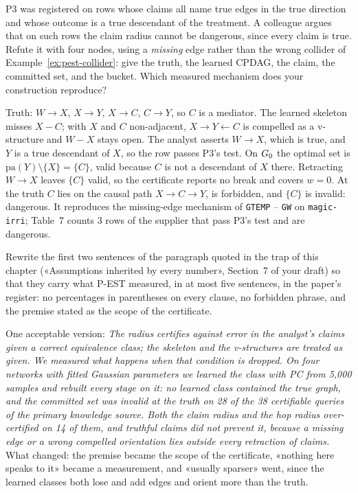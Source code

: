 \begin{exercicio}[metodo=counterexample,conceito=premissa-classe]
P3 was registered on rows whose claims all name true edges in the true direction and whose outcome is
a true descendant of the treatment. A colleague argues that on such rows the claim radius cannot be
dangerous, since every claim is true. Refute it with four nodes, using a \emph{missing} edge rather
than the wrong collider of Example~\ref{ex:pest-collider}: give the truth, the learned CPDAG, the claim,
the committed set, and the bucket. Which measured mechanism does your construction reproduce?
\end{exercicio}
\begin{solucao}
Truth: $W \to X$, $X \to Y$, $X \to C$, $C \to Y$, so $C$ is a mediator. The learned skeleton misses
$X - C$; with $X$ and $C$ non-adjacent, $X \to Y \leftarrow C$ is compelled as a v-structure and $W - X$
stays open. The analyst asserts $W \to X$, which is true, and $Y$ is a true descendant of $X$, so the
row passes P3's test. On $G_0$ the optimal set is $\mathrm{pa}(Y) \setminus \{X\} = \{C\}$, valid
because $C$ is not a descendant of $X$ there. Retracting $W \to X$ leaves $\{C\}$ valid, so the
certificate reports no break and covers $w = 0$. At the truth $C$ lies on the causal path
$X \to C \to Y$, is forbidden, and $\{C\}$ is invalid: dangerous. It reproduces the missing-edge
mechanism of
\texttt{GTEMP} -- \texttt{GW} on \texttt{magic-irri}; Table~7 counts 3 rows of the supplier that pass
P3's test and are dangerous.
\end{solucao}

\begin{exercicio}[metodo=rewriting,conceito=frases-proibidas]
Rewrite the first two sentences of the paragraph quoted in the trap of this chapter («Assumptions
inherited by every number», Section~7 of your draft) so that they carry what P-EST measured, in at most
five sentences, in the paper's register: no percentages in parentheses on every clause, no forbidden
phrase, and the premise stated as the scope of the certificate.
\end{exercicio}
\begin{solucao}
One acceptable version: \emph{The radius certifies against error in the analyst's claims given a
correct equivalence class; the skeleton and the v-structures are treated as given. We measured what
happens when that condition is dropped. On four networks with fitted Gaussian parameters we learned the
class with PC from 5,000 samples and rebuilt every stage on it: no learned class contained the true
graph, and the committed set was invalid at the truth on 28 of the 38 certifiable queries of the
primary knowledge source. Both the claim radius and the hop radius over-certified on 14 of them, and
truthful claims did not prevent it, because a missing edge or a wrong compelled orientation lies
outside every retraction of claims.} What changed: the premise became the scope of the
certificate, «nothing here speaks to it» became a measurement, and «usually sparser» went, since the
learned classes both lose and add edges and orient more than the truth.
\end{solucao}

